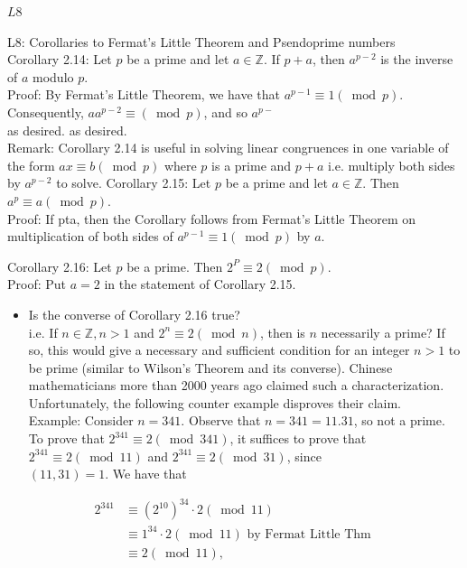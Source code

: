 \documentclass[10pt]{article}
\begin{document}
$L 8$

L8: Corollaries to Fermat's Little Theorem and Psendoprime numbers\\
Corollary 2.14: Let $p$ be a prime and let $a \in \mathbb{Z}$. If $p+a$, then $a^{p-2}$ is the inverse of $a$ modulo $p$.\\
Proof: By Fermat's Little Theorem, we have that $a^{p-1} \equiv 1(\bmod p)$. Consequently, $a a^{p-2} \equiv(\bmod p)$, and so $a^{p-}$\\
as desired. as desired.\\
Remark: Corollary 2.14 is useful in solving linear congruences in one variable of the form $a x \equiv b(\bmod p)$ where $p$ is a prime and $p+a$ i.e. multiply both sides by $a^{p-2}$ to solve. Corollary 2.15: Let $p$ be a prime and let $a \in \mathbb{Z}$. Then $a^{p} \equiv a(\bmod p)$.\\
Proof: If pta, then the Corollary follows from Fermat's Little Theorem on multiplication of both sides of $a^{p-1} \equiv 1(\bmod p)$ by $a$.

Corollary 2.16: Let $p$ be a prime. Then $2^{P} \equiv 2(\bmod p)$.\\
Proof: Put $a=2$ in the statement of Corollary 2.15.

\begin{itemize}
  \item Is the converse of Corollary 2.16 true?\\
i.e. If $n \in \mathbb{Z}, n>1$ and $2^{n} \equiv 2(\bmod n)$, then is $n$ necessarily a prime? If so, this would give a necessary and sufficient condition for an integer $n>1$ to be prime (similar to Wilson's Theorem and its converse). Chinese mathematicians more than 2000 years ago claimed such a characterization. Unfortunately, the following counter example disproves their claim.\\
Example: Consider $n=341$. Observe that $n=341 =11.31$, so not a prime. To prove that $2^{341} \equiv 2(\bmod 341)$, it suffices to prove that $2^{341} \equiv 2(\bmod 11)$ and $2^{341} \equiv 2(\bmod 31)$, since\\
$(11,31)=1$. We have that
\end{itemize}

$$
\begin{aligned}
2^{341} & \equiv\left(2^{10}\right)^{34} \cdot 2(\bmod 11) \\
& \equiv 1^{34} \cdot 2(\bmod 11) \text { by Fermat Little Thm } \\
& \equiv 2(\bmod 11),
\end{aligned}
$$
\end{document}
